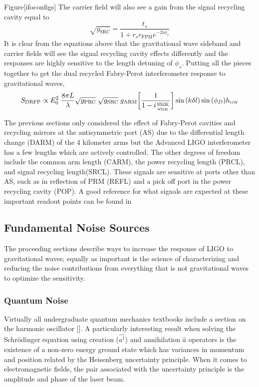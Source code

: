 		Figure[ifoconfigs]
		The carrier field will also see a gain from the signal recycling cavity equal to
		\begin{equation}
		\sqrt{g_{\text{SRC}}} = \frac{t_s}{1+ r_s r_{\text{FPM}}   e^{-2i\phi_s}}
		\end{equation}
		It is clear from the equations above that the gravitational wave sideband and carrier fields will see the signal recycling cavity effects differently and the responses are highly sensitive to the length detuning of $\phi_s$.
		Putting all the pieces together to get the dual recycled Fabry-Perot interferometer response to gravitational waves,
		\begin{equation}
		S_{\text{DRFP}} \propto E_0^2 \; \frac{8\pi L}{\lambda} \sqrt{g_{\text{PRC}}}\;\sqrt{g_{\text{SRC}}}\; g_{\text{ARM}} \bigg[\frac{1}{1 - i \frac{\omega_{\text{\tiny GW}}}{\omega_{\text{DR}}}}\bigg] \sin{(k\delta l)} \sin{(\phi_{D})} h_{\text{\tiny GW}}
		\end{equation}

		The previous sections only considered the effect of Fabry-Perot cavities and recycling mirrors at the antisymmetric port (AS) due to the differential length change (DARM) of the 4 kilometer arms but the Advanced LIGO interferometer has a few lengths which are actively controlled. The other degrees of freedom include the common arm length (CARM), the power recycling length (PRCL), and signal recycling length(SRCL).  These signals are sensitive at ports other than AS, such as in reflection of PRM (REFL) and a pick off port in the power recycling cavity (POP).  A good reference for what signals are expected at these important readout points can be found in \cite{kiwamu_freq1} \cite{kiwamu_freq2} \cite{kiwamu_freq3}
		
		\subsection{Fundamental Noise Sources}\label{funnoise}
		The proceeding sections describe ways to increase the response of LIGO to gravitational waves; equally as important is the science of characterizing and reducing the noise contributions from everything that is not gravitational waves to optimize the sensitivity.
		
		\subsubsection{Quantum Noise}\label{Sec:QuantumNoise}
		Virtually all undergraduate quantum mechanics textbooks include a section on the harmonic oscillator [\cite{Shankar}].  A particularly interesting result when solving the Schrödinger equation using creation ($\hat{a^{\dagger}}$) and annihilation $\hat{a}$ operators is the existence of a non-zero energy ground state which has variances in momentum and position related by the Heisenberg uncertainty principle.  When it comes to electromagnetic fields, the pair associated with the uncertainty principle is the amplitude and phase of the laser beam.
		
